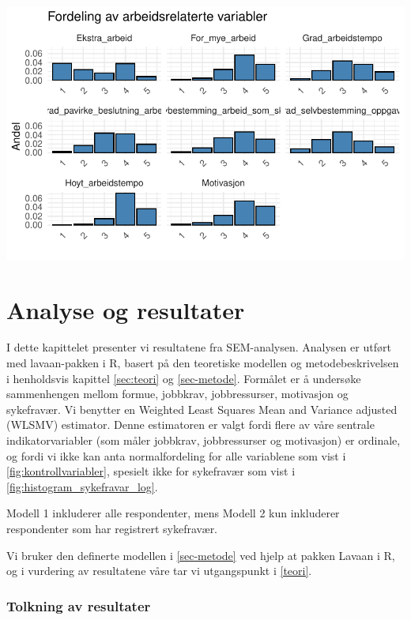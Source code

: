 \documentclass[
  12pt,
  a4paper,
  DIV=11,
  numbers=noendperiod]{scrartcl}
\begin{document}
\includegraphics{kand_SOK2209_Bacheloroppgave_V25_files/figure-pdf/unnamed-chunk-19-1.pdf}

\newpage

\section{Analyse og resultater}\label{sec-analyse}

I dette kapittelet presenter vi resultatene fra SEM-analysen. Analysen
er utført med lavaan-pakken i R, basert på den teoretiske modellen og
metodebeskrivelsen i henholdsvis kapittel \ref{sec:teori} og
\ref{sec-metode}. Formålet er å undersøke sammenhengen mellom formue,
jobbkrav, jobbressurser, motivasjon og sykefravær. Vi benytter en
Weighted Least Squares Mean and Variance adjusted (WLSMV) estimator.
Denne estimatoren er valgt fordi flere av våre sentrale
indikatorvariabler (som måler jobbkrav, jobbressurser og motivasjon) er
ordinale, og fordi vi ikke kan anta normalfordeling for alle variablene
som vist i \autoref{fig:kontrollvariabler}, spesielt ikke for sykefravær
som vist i \autoref{fig:histogram_sykefravar_log}.

Modell 1 inkluderer alle respondenter, mens Modell 2 kun inkluderer
respondenter som har registrert sykefravær.

Vi bruker den definerte modellen i \ref{sec-metode} ved hjelp at pakken
Lavaan i R, og i vurdering av resultatene våre tar vi utgangspunkt i
\ref{teori}.

\subsubsection{Tolkning av resultater}\label{tolkning-av-resultater}
\end{document}
